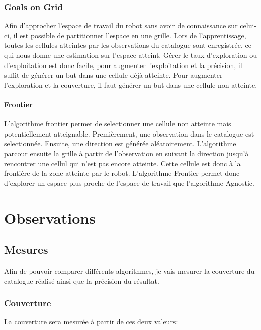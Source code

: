 \documentclass[11pt,french]{report}
\begin{document}
\subsection{Goals on Grid}

Afin d'approcher l'espace de travail du robot sans avoir de connaissance sur celui-ci, il est possible de partitionner l'espace en une grille. Lors de l'apprentissage, toutes les cellules atteintes par les observations du catalogue sont enregistrée, ce qui nous donne une estimation sur l'espace atteint. Gérer le taux d'exploration ou d'exploitation est donc facile, pour augmenter l'exploitation et la précision, il suffit de générer un but dans une cellule déjà atteinte. Pour augmenter l'exploration et la couverture, il faut générer un but dans une cellule non atteinte. 

\subsubsection{Frontier}

L'algorithme frontier permet de selectionner une cellule non atteinte mais potentiellement atteignable. Premièrement, une observation dans le catalogue est selectionnée. Ensuite, une direction est générée aléatoirement. L'algorithme parcour ensuite la grille à partir de l'observation en suivant la direction jusqu'à rencontrer une cellul qui n'est pas encore atteinte. Cette cellule est donc à la frontière de la zone atteinte par le robot. L'algorithme Frontier permet donc d'explorer un espace plus proche de l'espace de travail que l'algorithme Agnostic.


\chapter{Observations}

\section{Mesures}

Afin de pouvoir comparer différents algorithmes, je vais mesurer la couverture du catalogue réalisé ainsi que la précision du résultat.

\subsection{Couverture}

La couverture sera mesurée à partir de ces deux valeurs:
\end{document}
